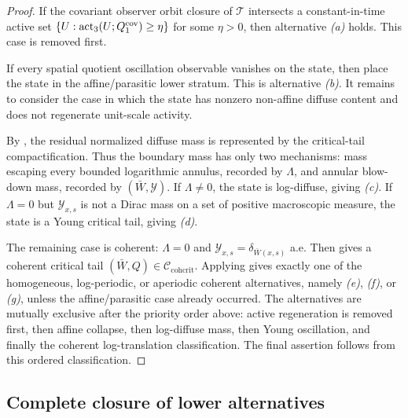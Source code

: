 \documentclass[11pt]{amsart}
\numberwithin{equation}{section}
\theoremstyle{plain}
\theoremstyle{definition}
\theoremstyle{remark}
\newcommand{\Ccohcrit}{\mathcal C_{\mathrm{cohcrit}}}
\newcommand{\actthree}{\operatorname{act}_3}
\begin{document}
\begin{proof}
If the covariant observer orbit closure of \(\mathcal T\) intersects a
constant-in-time active set \(\{U:\actthree(U;Q_1^{\rm cov})\ge
\eta\}\) for some \(\eta>0\), then alternative \emph{(a)} holds.  This case is
removed first.

If every spatial quotient oscillation observable vanishes on the state, then
place the state in the affine/parasitic lower stratum.  This is alternative
\emph{(b)}.  It remains to consider the case in which the state has nonzero
non-affine diffuse content and does not regenerate unit-scale activity.

By , the residual normalized
diffuse mass is represented by the critical-tail compactification.  Thus the
boundary mass has only two mechanisms: mass escaping every bounded logarithmic
annulus, recorded by \(\Lambda\), and annular blow-down mass, recorded by
\((\bar W,\mathcal Y)\).  If \(\Lambda\ne0\), the state is log-diffuse, giving
\emph{(c)}.  If \(\Lambda=0\) but \(\mathcal Y_{x,s}\) is not a Dirac mass on a
set of positive macroscopic measure, the state is a Young critical tail, giving
\emph{(d)}.

The remaining case is coherent: \(\Lambda=0\) and
\(\mathcal Y_{x,s}=\delta_{\bar W(x,s)}\) a.e.  Then
 gives a coherent critical tail
\((\bar W,Q)\in\Ccohcrit\).  Applying
 gives exactly one of the
homogeneous, log-periodic, or aperiodic coherent alternatives, namely
\emph{(e)}, \emph{(f)}, or \emph{(g)}, unless the affine/parasitic case already
occurred.  The alternatives are mutually exclusive after the priority order
above: active regeneration is removed first, then affine collapse, then
log-diffuse mass, then Young oscillation, and finally the coherent
log-translation classification.  The final assertion follows from this ordered
classification.
\end{proof}

\subsection{Complete closure of lower alternatives}
\label{sec:complete-branch-closure-package}
\end{document}
